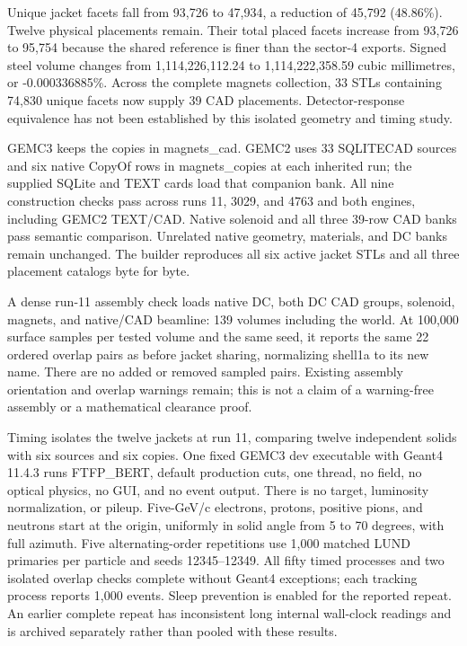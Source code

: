 Unique jacket facets fall from 93,726 to 47,934, a reduction of 45,792 (48.86\%). Twelve physical placements
remain. Their total placed facets increase from 93,726 to 95,754 because the shared reference is finer than
the sector-4 exports. Signed steel volume changes from 1,114,226,112.24 to 1,114,222,358.59 cubic millimetres,
or -0.000336885\%. Across the complete magnets collection, 33 STLs containing 74,830 unique facets now supply
39 CAD placements. Detector-response equivalence has not been established by this isolated geometry and timing
study.

GEMC3 keeps the copies in magnets\_cad. GEMC2 uses 33 SQLITECAD sources and six native CopyOf rows in
magnets\_copies at each inherited run; the supplied SQLite and TEXT cards load that companion bank. All nine
construction checks pass across runs 11, 3029, and 4763 and both engines, including GEMC2 TEXT/CAD. Native
solenoid and all three 39-row CAD banks pass semantic comparison. Unrelated native geometry, materials, and DC
banks remain unchanged. The builder reproduces all six active jacket STLs and all three placement catalogs
byte for byte.

A dense run-11 assembly check loads native DC, both DC CAD groups, solenoid, magnets, and native/CAD beamline:
139 volumes including the world. At 100,000 surface samples per tested volume and the same seed, it reports
the same 22 ordered overlap pairs as before jacket sharing, normalizing shell1a to its new name. There are no
added or removed sampled pairs. Existing assembly orientation and overlap warnings remain; this is not a claim
of a warning-free assembly or a mathematical clearance proof.

Timing isolates the twelve jackets at run 11, comparing twelve independent solids with six sources and six
copies. One fixed GEMC3 dev executable with Geant4 11.4.3 runs FTFP\_BERT, default production cuts, one
thread, no field, no optical physics, no GUI, and no event output. There is no target, luminosity
normalization, or pileup. Five-GeV/c electrons, protons, positive pions, and neutrons start at the origin,
uniformly in solid angle from 5 to 70 degrees, with full azimuth. Five alternating-order repetitions use 1,000
matched LUND primaries per particle and seeds 12345--12349. All fifty timed processes and two isolated overlap
checks complete without Geant4 exceptions; each tracking process reports 1,000 events. Sleep prevention is
enabled for the reported repeat. An earlier complete repeat has inconsistent long internal wall-clock readings
and is archived separately rather than pooled with these results.

